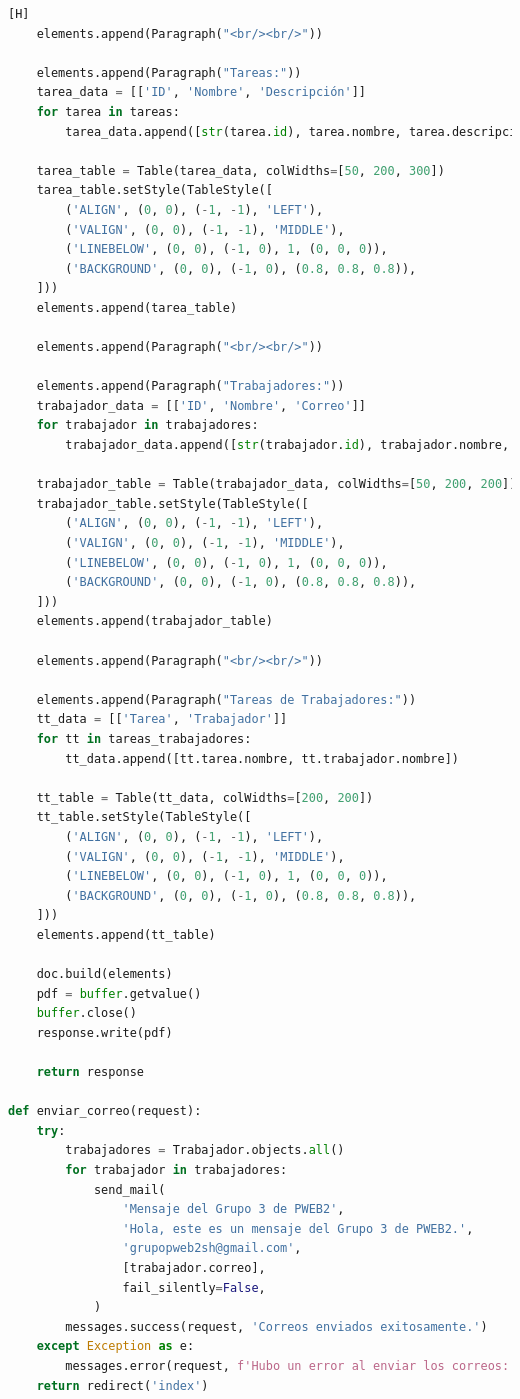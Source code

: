 \documentclass{article}
\begin{document}
\begin{itemize}
\begin{itemize}
\begin{lstlisting}[language=Python,caption={views.py}][H]
    elements.append(Paragraph("<br/><br/>"))

    elements.append(Paragraph("Tareas:"))
    tarea_data = [['ID', 'Nombre', 'Descripción']]
    for tarea in tareas:
        tarea_data.append([str(tarea.id), tarea.nombre, tarea.descripcion])

    tarea_table = Table(tarea_data, colWidths=[50, 200, 300])
    tarea_table.setStyle(TableStyle([
        ('ALIGN', (0, 0), (-1, -1), 'LEFT'),
        ('VALIGN', (0, 0), (-1, -1), 'MIDDLE'),
        ('LINEBELOW', (0, 0), (-1, 0), 1, (0, 0, 0)),
        ('BACKGROUND', (0, 0), (-1, 0), (0.8, 0.8, 0.8)),
    ]))
    elements.append(tarea_table)

    elements.append(Paragraph("<br/><br/>"))

    elements.append(Paragraph("Trabajadores:"))
    trabajador_data = [['ID', 'Nombre', 'Correo']]
    for trabajador in trabajadores:
        trabajador_data.append([str(trabajador.id), trabajador.nombre, trabajador.correo])

    trabajador_table = Table(trabajador_data, colWidths=[50, 200, 200])
    trabajador_table.setStyle(TableStyle([
        ('ALIGN', (0, 0), (-1, -1), 'LEFT'),
        ('VALIGN', (0, 0), (-1, -1), 'MIDDLE'),
        ('LINEBELOW', (0, 0), (-1, 0), 1, (0, 0, 0)),
        ('BACKGROUND', (0, 0), (-1, 0), (0.8, 0.8, 0.8)),
    ]))
    elements.append(trabajador_table)

    elements.append(Paragraph("<br/><br/>"))

    elements.append(Paragraph("Tareas de Trabajadores:"))
    tt_data = [['Tarea', 'Trabajador']]
    for tt in tareas_trabajadores:
        tt_data.append([tt.tarea.nombre, tt.trabajador.nombre])

    tt_table = Table(tt_data, colWidths=[200, 200])
    tt_table.setStyle(TableStyle([
        ('ALIGN', (0, 0), (-1, -1), 'LEFT'),
        ('VALIGN', (0, 0), (-1, -1), 'MIDDLE'),
        ('LINEBELOW', (0, 0), (-1, 0), 1, (0, 0, 0)),
        ('BACKGROUND', (0, 0), (-1, 0), (0.8, 0.8, 0.8)),
    ]))
    elements.append(tt_table)

    doc.build(elements)
    pdf = buffer.getvalue()
    buffer.close()
    response.write(pdf)

    return response

def enviar_correo(request):
    try:
        trabajadores = Trabajador.objects.all()
        for trabajador in trabajadores:
            send_mail(
                'Mensaje del Grupo 3 de PWEB2',
                'Hola, este es un mensaje del Grupo 3 de PWEB2.',
                'grupopweb2sh@gmail.com',
                [trabajador.correo],
                fail_silently=False,
            )
        messages.success(request, 'Correos enviados exitosamente.')
    except Exception as e:
        messages.error(request, f'Hubo un error al enviar los correos: {e}')
    return redirect('index')


\end{lstlisting}
\end{itemize}
\end{itemize}
\end{document}
